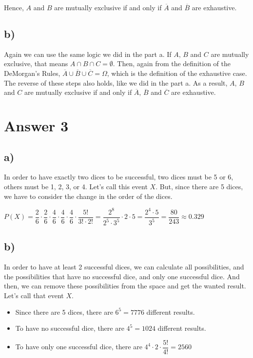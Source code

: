 \documentclass[12pt]{article}
\begin{document}
    Hence, $A$ and $B$ are mutually exclusive if and only if $\overline{A}$ and $\overline{B}$ are exhaustive.

\subsection*{b)}
    Again we can use the same logic we did in the part a. If $A$, $B$ and $C$ are mutually exclusive, that means $A \cap B \cap C = \emptyset$. Then, again from the definition of the DeMorgan's Rules, $\overline{A} \cup \overline{B} \cup \overline{C} = \Omega$, which is the definition of the exhaustive case. The reverse of these steps also holds, like we did in the part a. As a result, $A$, $B$ and $C$ are mutually exclusive if and only if $\overline{A}$, $\overline{B}$ and $\overline{C}$ are exhaustive.

\section*{Answer 3}

\subsection*{a)}
    In order to have exactly two dices to be successful, two dices must be 5 or 6, others must be 1, 2, 3, or 4. Let's call this event $X$. But, since there are 5 dices, we have to consider the change in the order of the dices.
    
    \begin{center}
        $P(X) = \dfrac{2}{6} \cdot \dfrac{2}{6} \cdot \dfrac{4}{6} \cdot \dfrac{4}{6} \cdot \dfrac{4}{6} \cdot \dfrac{5!}{3! \cdot 2!} = \dfrac{2^8}{2^5 \cdot 3^5} \cdot 2 \cdot 5 = \dfrac{2^4 \cdot 5}{3^5} = \dfrac{80}{243} \approx 0.329$
    \end{center}{}
    
\subsection*{b)}
    In order to have at least 2 successful dices, we can calculate all possibilities, and the possibilities that have no successful dice, and only one successful dice. And then, we can remove these possibilities from the space and get the wanted result. Let's call that event $X$.
    
    \begin{itemize}
        \item Since there are 5 dices, there are $6^5 = 7776$ different results.
        \item To have no successful dice, there are $4^5 = 1024$ different results.
        \item To have only one successful dice, there are $4^4 \cdot 2 \cdot \dfrac{5!}{4!} = 2560$
    \end{itemize}{}
    
\end{document}
